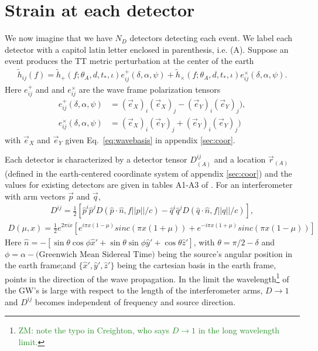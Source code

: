 \documentclass[aps,prd,amsmath,showpacs,amssymb,superscriptaddress,nofootinbib,longbibliography,eqsecnum,preprintnumbers]{revtex4-1}
\newcommand{\zach}[1]{\textcolor{ForestGreen}{#1}}
\begin{document}
\section{Strain at each detector}

We now imagine that we have $N_D$ detectors detecting each event. We label each detector with a capitol latin letter enclosed in parenthesis, i.e. (A). Suppose an event produces the TT metric perturbation at the center of the earth
\begin{align}
\tilde h_{ij}(f)=\tilde h_+(f;\theta_A,d,t_*,\iota)e_{ij}^+(\delta,\alpha,\psi) +\tilde h_\times(f;\theta_A,d,t_*,\iota)e_{ij}^\times(\delta,\alpha,\psi).
\end{align}
Here $e^+_{ij}$ and and $e^\times_{ij}$ are the wave frame polarization tensors
\begin{align}
e^+_{ij}(\delta,\alpha,\psi)&=(\vec e_X)_i(\vec e_X)_j-(\vec e_Y)_i(\vec e_Y)_j), \nonumber \\
e^\times_{ij}(\delta,\alpha,\psi)&=(\vec e_X)_i(\vec e_Y)_j+(\vec e_Y)_i(\vec e_Y)_j)
\end{align}
with $\vec e_X$ and $\vec e_Y$ given Eq.~\eqref{eq:wavebasis} in appendix \ref{sec:coor}.

Each detector is characterized by a detector tensor $D_{(A)}^{ij}$ and a location $\vec r_{(A)}$ (defined in the earth-centered coordinate system of appendix \ref{sec:coor}) and the values for existing detectors are given in tables A1-A3 of \cite{Creighton:2011zz}. For an interferometer with arm vectors $\vec p$ and $\vec q$,
\begin{align}
D^{ij}=\frac{1}{2}\left [\hat p^i\hat p^jD(\hat p \cdot \hat n, f||p||/c)-\hat q^i\hat q^jD(\hat q \cdot \hat n, f||q||/c)\right],
\end{align}
\begin{align}
D(\mu,x)=\frac{1}{2}e^{2\pi ix}\left[e^{i\pi x(1-\mu)}sinc(\pi x(1+\mu))+e^{-i\pi x(1+\mu)}sinc(\pi x(1-\mu))\right]
\end{align}
Here $\hat n= -[\sin\theta \cos\phi \hat x'+\sin\theta \sin\phi \hat y'+\cos\theta \hat z']$, with $\theta =\pi/2-\delta$ and $\phi=\alpha -\text{(Greenwich Mean Sidereal Time)}$ being the source's angular position in the earth frame;and $\{\hat x',\hat y',\hat z'\}$ being the cartesian basis in the earth frame, points in the direction of the wave propagation.
In the limit the wavelength\footnote{\zach{ZM: note the typo in Creighton, who says $D\to 1$ in the long wavelength limit.}} of the GW's is large with respect to the length of the interferometer arms, $D\to 1$ and $D^{ij}$ becomes independent of frequency and source direction.
\end{document}
